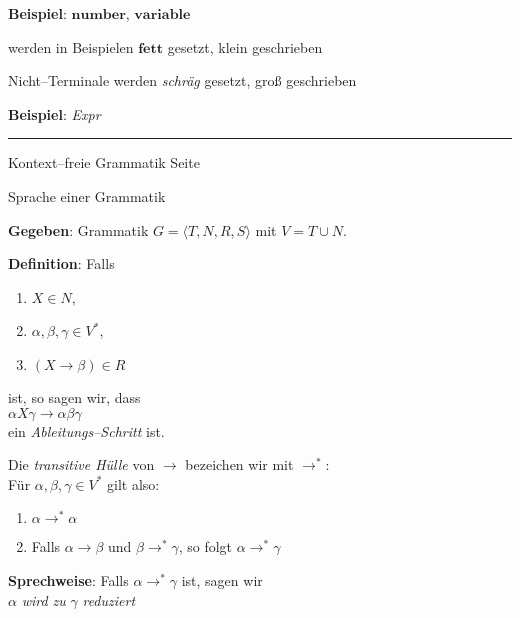 \begin{slide}{}
\begin{enumerate}
      \textbf{Beispiel}: $\mathbf{number}$, $\mathbf{variable}$
    
      werden in Beispielen $\mathbf{fett}$ gesetzt, klein geschrieben
\end{enumerate}
Nicht--Terminale werden \textsl{schr\"ag} gesetzt, gro{\ss} geschrieben

\textbf{Beispiel}: \textsl{Expr}

\vspace*{\fill}
\tiny \addtocounter{mypage}{1}
\rule{17cm}{1mm}
Kontext--freie Grammatik  \hspace*{\fill} Seite 
\end{slide}


\begin{slide}{}
\normalsize

\begin{center}
Sprache einer Grammatik
\end{center}
\vspace*{0.5cm}

\footnotesize
\textbf{Gegeben}: Grammatik $G = \langle T, N, R, S \rangle$ mit $V = T \cup N$.

\textbf{Definition}: Falls
\begin{enumerate}
\item $X \in N$,
\item $\alpha, \beta, \gamma \in V^*$,
\item $(X \rightarrow \beta) \in R$
\end{enumerate}
ist, so sagen wir, dass \\[0.3cm]
\hspace*{1.3cm} $\alpha X \gamma \rightarrow \alpha \beta \gamma$ \\[0.3cm]
ein \emph{Ableitungs--Schritt}  ist.

Die \emph{transitive H\"ulle} von $\rightarrow$ bezeichen wir mit $\rightarrow^*$: \\
F\"ur $\alpha, \beta, \gamma \in V^*$ gilt also:
\begin{enumerate}
\item $\alpha \rightarrow^* \alpha$
\item Falls $\alpha \rightarrow \beta$ und $\beta \rightarrow^* \gamma$, so folgt $\alpha \rightarrow^* \gamma$
\end{enumerate}
\textbf{Sprechweise}: Falls $\alpha \rightarrow^* \gamma$ ist, sagen wir \\[0.3cm]
\hspace*{1.3cm}  $\alpha$ \emph{wird zu} $\gamma$ \emph{reduziert}


\end{slide}
